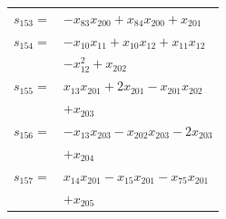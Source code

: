 \begin{longtable}{@{}r@{\;}l@{}}
\(s_{153}=\) & \(\displaystyle -x_{83}x_{200} +x_{84}x_{200} +x_{201}\) \\[3pt]
\(s_{154}=\) & \(\displaystyle -x_{10}x_{11} +x_{10}x_{12} +x_{11}x_{12}\) \\
 & \(\displaystyle -x_{12}^{2} +x_{202}\) \\[3pt]
\(s_{155}=\) & \(\displaystyle x_{13}x_{201} +2x_{201} -x_{201}x_{202}\) \\
 & \(\displaystyle +x_{203}\) \\[3pt]
\(s_{156}=\) & \(\displaystyle -x_{13}x_{203} -x_{202}x_{203} -2x_{203}\) \\
 & \(\displaystyle +x_{204}\) \\[3pt]
\(s_{157}=\) & \(\displaystyle x_{14}x_{201} -x_{15}x_{201} -x_{75}x_{201}\) \\
 & \(\displaystyle +x_{205}\) \\[3pt]
\end{longtable}
\endgroup
